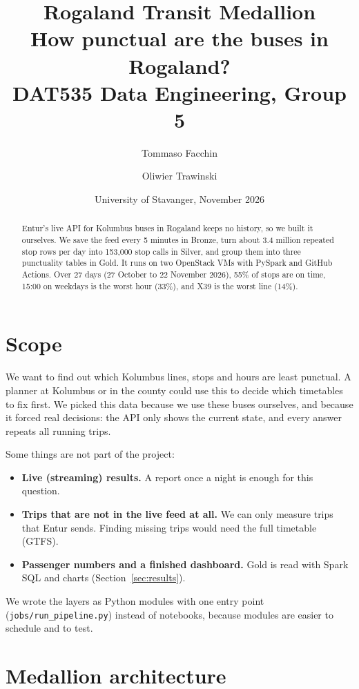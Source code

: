 \documentclass[11pt,a4paper]{article}
\title{\textbf{Rogaland Transit Medallion}\\[0.3em]
\large How punctual are the buses in Rogaland?\\[0.5em]
\normalsize DAT535 Data Engineering, Group 5}
\author{Tommaso Facchin \and Oliwier Trawinski}
\date{University of Stavanger, November 2026}
\newcommand{\code}[1]{\texttt{#1}}
\begin{document}
\maketitle

\begin{abstract}
\noindent
Entur's live API for Kolumbus buses in Rogaland keeps no history, so we built it ourselves.
We save the feed every 5 minutes in Bronze, turn about 3.4 million repeated stop rows per day
into 153{,}000 stop calls in Silver, and group them into three punctuality tables in Gold. It
runs on two OpenStack VMs with PySpark and GitHub Actions. Over 27 days (27 October to
22 November 2026), 55\% of stops are on time, 15:00 on weekdays is the worst hour (33\%), and
X39 is the worst line (14\%).
\end{abstract}

\section{Scope}

We want to find out which Kolumbus lines, stops and hours are least punctual. A planner at
Kolumbus or in the county could use this to decide which timetables to fix first. We picked
this data because we use these buses ourselves, and because it forced real decisions: the API
only shows the current state, and every answer repeats all running trips.

Some things are not part of the project:
\begin{itemize}
  \item \textbf{Live (streaming) results.} A report once a night is enough for this question.
  \item \textbf{Trips that are not in the live feed at all.} We can only measure trips that
        Entur sends. Finding missing trips would need the full timetable (GTFS).
  \item \textbf{Passenger numbers and a finished dashboard.} Gold is read with Spark SQL and
        charts (Section~\ref{sec:results}).
\end{itemize}

We wrote the layers as Python modules with one entry point (\code{jobs/run\_pipeline.py})
instead of notebooks, because modules are easier to schedule and to test.

\section{Medallion architecture}
\end{document}
